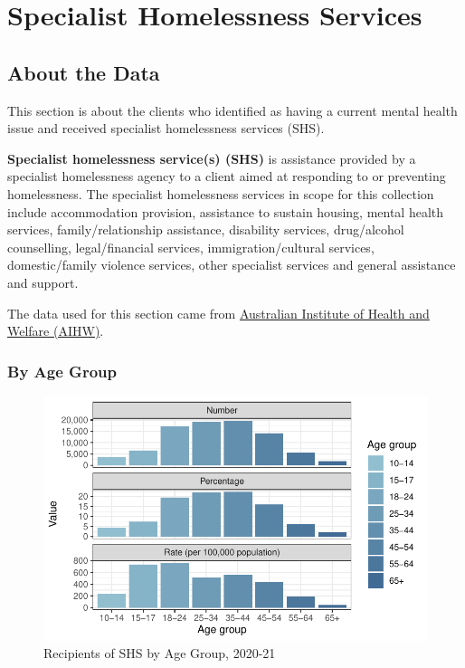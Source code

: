 \documentclass[
  a4paper,
  DIV=11,
  numbers=noendperiod]{scrreport}
\begin{document}

\hypertarget{specialist-homelessness-services}{%
\chapter{Specialist Homelessness
Services}\label{specialist-homelessness-services}}

\hypertarget{about-the-data-2}{%
\section{About the Data}\label{about-the-data-2}}

This section is about the clients who identified as having a current
mental health issue and received specialist homelessness services (SHS).

\textbf{Specialist homelessness service(s) (SHS)} is assistance provided
by a specialist homelessness agency to a client aimed at responding to
or preventing homelessness. The specialist homelessness services in
scope for this collection include accommodation provision, assistance to
sustain housing, mental health services, family/relationship assistance,
disability services, drug/alcohol counselling, legal/financial services,
immigration/cultural services, domestic/family violence services, other
specialist services and general assistance and support.

The data used for this section came from
\href{https://www.aihw.gov.au/mental-health/topic-areas/specialist-homelessness-services}{Australian
Institute of Health and Welfare (AIHW)}.

\hypertarget{by-age-group-3}{%
\subsection{By Age Group}\label{by-age-group-3}}

\begin{figure}

\caption{\label{fig-shs-a}Recipients of SHS by Age Group, 2020-21}

{\centering \includegraphics{./chap3-shs_files/figure-pdf/fig-shs-a-1.pdf}

}

\end{figure}
\end{document}
